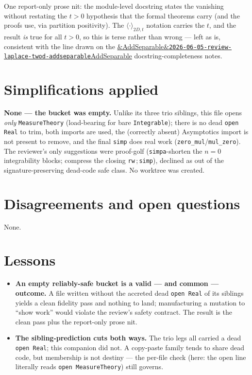 \documentclass[11pt]{article}
\newcommand{\reviewref}[2][]{\href{https://therisensea.org/reviews/#2/}{\ifx&#1&\texttt{#2}\else#1\fi}}
\begin{document}
One report-only prose nit: the module-level docstring states the vanishing without restating the
$t>0$ hypothesis that the formal theorems carry (and the proofs use, via partition positivity). The
$\langle\cdot\rangle_{2D,t}$ notation carries the $t$, and the result \emph{is} true for all $t>0$,
so this is terse rather than wrong --- left as is, consistent with the line drawn on the
\reviewref[AddSeparable]{2026-06-05-review-laplace-twod-addseparable} docstring-completeness notes.

\section{Simplifications applied}
\textbf{None --- the bucket was empty.} Unlike its three trio siblings, this file opens \emph{only}
\texttt{MeasureTheory} (load-bearing for bare \texttt{Integrable}); there is no dead \texttt{open
Real} to trim, both imports are used, the (correctly absent) Asymptotics import is not present to
remove, and the final \texttt{simp} does real work (\texttt{zero\_mul}/\texttt{mul\_zero}). The
reviewer's only suggestions were proof-golf (\texttt{simpa}-shorten the $n=0$ integrability blocks;
compress the closing \texttt{rw}\,;\,\texttt{simp}), declined as out of the signature-preserving
dead-code safe class. No worktree was created.

\section{Disagreements and open questions}
None.

\section{Lessons}
\begin{itemize}[noitemsep]
  \item \textbf{An empty reliably-safe bucket is a valid --- and common --- outcome.} A file written
    without the accreted dead \texttt{open Real} of its siblings yields a clean fidelity pass and
    nothing to land; manufacturing a mutation to ``show work'' would violate the review's safety
    contract. The result is the clean pass plus the report-only prose nit.
  \item \textbf{The sibling-prediction cuts both ways.} The trio legs all carried a dead
    \texttt{open Real}; this companion did not. A copy-paste family tends to share dead code, but
    membership is not destiny --- the per-file check (here: the open line literally reads
    \texttt{open MeasureTheory}) still governs.
\end{itemize}
\end{document}
